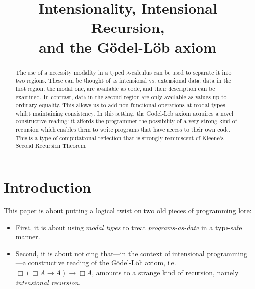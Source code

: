 \documentclass{myifcolog}
\title{Intensionality, Intensional Recursion, \\
  and the G\"odel-L\"ob axiom}
\theoremstyle{definition}
\begin{document}
\maketitle

\begin{abstract}
  The use of a necessity modality in a typed $\lambda$-calculus
  can be used to separate it into two regions. These can be
  thought of as intensional vs. extensional data: data in the
  first region, the modal one, are available as code, and their
  description can be examined. In contrast, data in the second
  region are only available as values up to ordinary equality.
  This allows us to add non-functional operations at modal types
  whilst maintaining consistency. In this setting, the
  G\"odel-L\"ob axiom acquires a novel constructive reading: it
  affords the programmer the possibility of a very strong kind of
  recursion which enables them to write programs that have access
  to their own code. This is a type of computational reflection
  that is strongly reminiscent of Kleene's Second Recursion
  Theorem.
\end{abstract}




\section{Introduction}

This paper is about putting a logical twist on two old
pieces of programming lore:

\begin{itemize}
  \item
    First, it is about using \emph{modal types} to treat
    \emph{programs-as-data} in a type-safe manner.

  \item
    Second, it is about noticing that---in the context of
    intensional programming---a constructive reading of the
    G\"odel-L\"ob axiom, i.e. $\Box(\Box A \rightarrow A)
    \rightarrow \Box A$, amounts to a strange kind of recursion,
    namely \emph{intensional recursion}.
\end{itemize}
\end{document}
